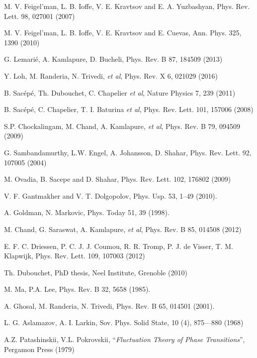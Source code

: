 \documentclass[twocolumn,english,prb]{revtex4-1}
\begin{document}
\begin{thebibliography}{99}

 M. V. Feigel'man, L. B. Ioffe, V. E. Kravtsov and E. A. Yuzbashyan, Phys. Rev. Lett.  98, 027001  (2007)

  M. V. Feigel'man, L. B. Ioffe, V. E. Kravtsov and E. Cuevas, Ann. Phys. 325, 1390 (2010)

  G. Lemarié, A. Kamlapure, D. Bucheli,  Phys. Rev. B 87, 184509 (2013) 

 Y. Loh, M. Randeria, N. Trivedi, \textit{et al}, Phys. Rev. X 6, 021029 (2016) 

  B. Sac\'ep\'e, Th. Dubouchet, C. Chapelier \textit{et al}, Nature Physics 7, 239 (2011)

 B. Sac\'ep\'e, C. Chapelier, T. I. Baturina \textit{et al},
Phys. Rev. Lett. 101, 157006 (2008)

 S.P. Chockalingam, M. Chand, A. Kamlapure, \textit{et al}, Phys. Rev. B 79, 
094509 (2009)

 G. Sambandamurthy, L.W. Engel, A. Johansson, D. Shahar, Phys. Rev. Lett. 92,  107005 (2004)

  M. Ovadia,  B. Sacepe and D. Shahar,  Phys. Rev. Lett. 102, 176802 (2009)

 V. F. Gantmakher and V. T.  Dolgopolov,  Phys. Usp. 53, 1–49 (2010).

 A. Goldman, N. Markovic, Phys. Today 51, 39 (1998).

 M. Chand, G. Saraswat, A. Kamlapure, \textit{et al}, Phys. Rev. B 85, 014508 (2012) 

 E. F. C. Driessen, P. C. J. J. Coumou, R. R. Tromp, P. J. de Visser, T. M. Klapwijk, Phys. Rev. Lett. 109, 107003 (2012) 



 Th. Dubouchet, PhD thesis, Neel Institute, Grenoble (2010)

 M. Ma, P.A. Lee, Phys. Rev. B 32, 5658 (1985).

 A. Ghosal, M. Randeria, N. Trivedi, Phys. Rev. B 65, 014501 (2001).

L. G. Aslamazov, A. I. Larkin, Sov. Phys. Solid State, 10 (4), 875—880 (1968)

A.Z. Patashinskii, V.L. Pokrovskii, ``\textit{Fluctuation Theory of Phase Transitions}'', Pergamon Press (1979)
	

\end{thebibliography}
\end{document}
